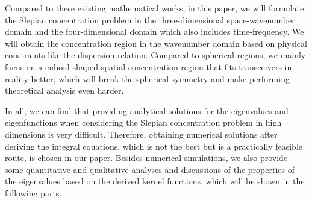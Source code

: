 \documentclass[12pt,draftclsnofoot,journal,onecolumn]{IEEEtran}
\begin{document}
{	Compared to these existing mathematical works, in this paper, we will formulate the Slepian concentration problem in the three-dimensional space-wavenumber domain and the four-dimensional domain which also includes time-frequency. We will obtain the concentration region in the wavenumber domain based on physical constraints like the dispersion relation. Compared to spherical regions, we mainly focus on a cuboid-shaped spatial concentration region that fits transceivers in reality better, which will break the spherical symmetry and make performing theoretical analysis even harder.  
	
	In all, we can find that providing analytical solutions for the eigenvalues and eigenfunctions when considering the Slepian concentration problem in high dimensions is very difficult. Therefore, obtaining numerical solutions after deriving the integral equations, which is not the best but is a practically feasible route, is chosen in our paper. Besides numerical simulations, we also provide some quantitative and qualitative analyses and discussions of the properties of the eigenvalues based on the derived kernel functions, which will be shown in the following parts.

}
	
\end{document}
